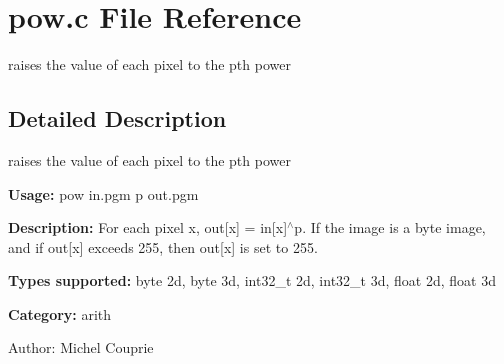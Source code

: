 \section{pow.c File Reference}
\label{pow_8c}
raises the value of each pixel to the pth power 



\subsection{Detailed Description}
raises the value of each pixel to the pth power 

{\bf Usage:} pow in.pgm p out.pgm

{\bf Description:} For each pixel x, out[x] = in[x]$^\wedge$p. If the image is a byte image, and if out[x] exceeds 255, then out[x] is set to 255.

{\bf Types supported:} byte 2d, byte 3d, int32\_\-t 2d, int32\_\-t 3d, float 2d, float 3d

{\bf Category:} arith

\begin{Desc}
\item[Author:]Michel Couprie \end{Desc}
